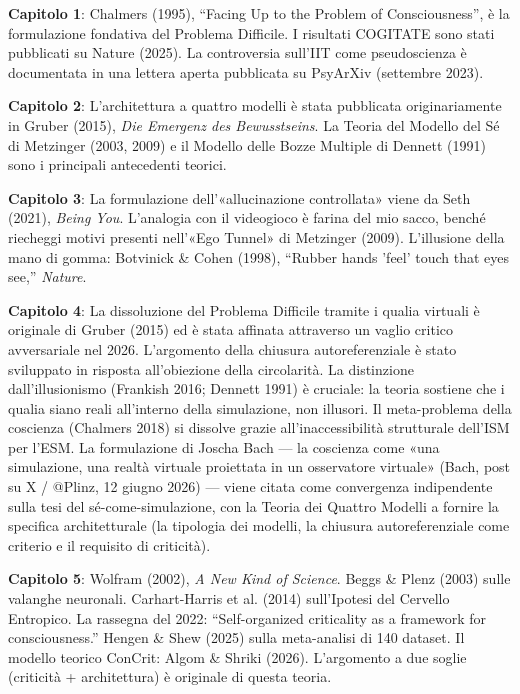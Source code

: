 \documentclass[11pt, twoside, openright]{book}
\begin{document}
\textbf{Capitolo 1}: Chalmers (1995), ``Facing Up to the Problem of Consciousness'', è la formulazione fondativa del Problema Difficile. I risultati COGITATE sono stati pubblicati su Nature (2025). La controversia sull'IIT come pseudoscienza è documentata in una lettera aperta pubblicata su PsyArXiv (settembre 2023).

\textbf{Capitolo 2}: L'architettura a quattro modelli è stata pubblicata originariamente in Gruber (2015), \textit{Die Emergenz des Bewusstseins}. La Teoria del Modello del Sé di Metzinger (2003, 2009) e il Modello delle Bozze Multiple di Dennett (1991) sono i principali antecedenti teorici.

\textbf{Capitolo 3}: La formulazione dell'«allucinazione controllata» viene da Seth (2021), \textit{Being You}. L'analogia con il videogioco è farina del mio sacco, benché riecheggi motivi presenti nell'«Ego Tunnel» di Metzinger (2009). L'illusione della mano di gomma: Botvinick \& Cohen (1998), ``Rubber hands 'feel' touch that eyes see,'' \textit{Nature}.

\textbf{Capitolo 4}: La dissoluzione del Problema Difficile tramite i qualia virtuali è originale di Gruber (2015) ed è stata affinata attraverso un vaglio critico avversariale nel 2026. L'argomento della chiusura autoreferenziale è stato sviluppato in risposta all'obiezione della circolarità. La distinzione dall'illusionismo (Frankish 2016; Dennett 1991) è cruciale: la teoria sostiene che i qualia siano reali all'interno della simulazione, non illusori. Il meta-problema della coscienza (Chalmers 2018) si dissolve grazie all'inaccessibilità strutturale dell'ISM per l'ESM. La formulazione di Joscha Bach --- la coscienza come «una simulazione, una realtà virtuale proiettata in un osservatore virtuale» (Bach, post su X / @Plinz, 12 giugno 2026) --- viene citata come convergenza indipendente sulla tesi del sé-come-simulazione, con la Teoria dei Quattro Modelli a fornire la specifica architetturale (la tipologia dei modelli, la chiusura autoreferenziale come criterio e il requisito di criticità).

\textbf{Capitolo 5}: Wolfram (2002), \textit{A New Kind of Science}. Beggs \& Plenz (2003) sulle valanghe neuronali. Carhart-Harris et al. (2014) sull'Ipotesi del Cervello Entropico. La rassegna del 2022: ``Self-organized criticality as a framework for consciousness.'' Hengen \& Shew (2025) sulla meta-analisi di 140 dataset. Il modello teorico ConCrit: Algom \& Shriki (2026). L'argomento a due soglie (criticità + architettura) è originale di questa teoria.
\end{document}
